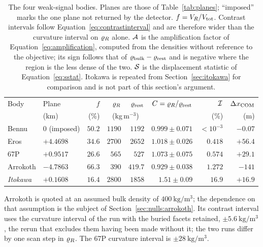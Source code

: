\begin{table}[htbp]
\centering
\small
\setlength{\tabcolsep}{4pt}
\caption{The four weak-signal bodies. Planes are those of
Table~\ref{tab:planes}; ``imposed'' marks the one plane not returned by
the detector. $f = V_{R}/V_{\mathrm{tot}}$. Contrast intervals follow
Equation~\eqref{eq:contrastinterval} and are therefore wider than the
curvature interval on $\varrho_{R}$ alone. $\mathcal{A}$ is the amplification
factor of Equation~\eqref{eq:amplification}, computed from the densities
without reference to the objective; its sign follows that of
$\varrho_{\mathrm{bulk}} - \varrho_{\mathrm{rest}}$ and is negative where the region is the less
dense of the two. $\mathcal{S}$ is the displacement statistic of
Equation~\eqref{eq:sstat}. Itokawa is repeated from
Section~\ref{sec:itokawa} for comparison and is not part of this section's
argument.}
\label{tab:nulls}
\setlength{\tabcolsep}{10pt}
\begin{tabular}{llrrrrrr}
\toprule
Body & Plane & $f$ & $\varrho_{R}$ & $\varrho_{\mathrm{rest}}$ & $C = \varrho_{R}/\varrho_{\mathrm{rest}}$
 & $\mathcal{I}$ & $\Delta x_{\mathrm{COM}}$ \\
 & (km) & (\%) & \multicolumn{2}{c}{(kg\,m$^{-3}$)} & & (\%) & (m) \\
\midrule
Bennu    & $0$ (imposed)   & $50.2$ & $1190$ & $1192$   & $0.999\pm0.071$ & $<10^{-3}$ & $-0.07$ \\
Eros     & $+4.4698$       & $34.6$ & $2700$ & $2652$   & $1.018\pm0.026$ & $0.418$    & $+56.4$ \\
67P      & $+0.9517$       & $26.6$ & $565$  & $527$    & $1.073\pm0.075$ & $0.574$ & $+29.1$ \\
Arrokoth & $-4.7863$       & $66.3$ & $390$  & $419.7$  & $0.929\pm0.038$ & $1.272$ & $-141$ \\
\midrule
\itshape Itokawa & \itshape $+0.1608$ & \itshape $16.4$ & \itshape $2800$
 & \itshape $1858$ & \itshape $1.51\pm0.09$ & \itshape $16.9$ & \itshape $+16.9$ \\
\bottomrule
\end{tabular}

\vspace{4pt}
\begin{minipage}{\textwidth}
\footnotesize
Arrokoth is quoted at an assumed bulk density of
$\SI{400}{\kilo\gram\per\cubic\metre}$; the dependence on that assumption
is the subject of Section~\ref{sec:nulls:arrokoth}. Its contrast interval
uses the curvature interval of the run with the buried facets retained,
$\pm\SI{5.6}{\kilo\gram\per\cubic\metre}$, the rerun that excludes them
having been made without it; the two runs differ by one scan step in
$\varrho_{R}$. The 67P curvature interval is $\pm\SI{28}{\kilo\gram\per\cubic\metre}$.
\end{minipage}
\end{table}

